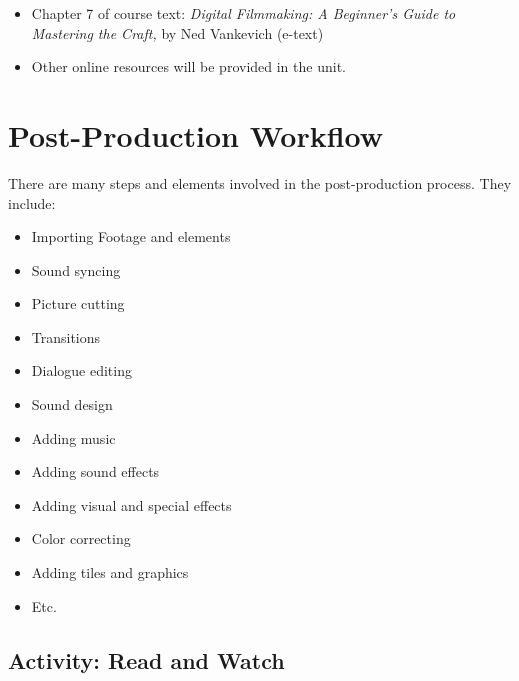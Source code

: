 \documentclass[
]{book}
\providecommand{\tightlist}{%
  \setlength{\itemsep}{0pt}\setlength{\parskip}{0pt}}
\begin{document}
\begin{itemize}
\tightlist
\item
  Chapter 7 of course text: \emph{Digital Filmmaking: A Beginner's Guide to Mastering the Craft,} by Ned Vankevich (e-text)
\item
  Other online resources will be provided in the unit.
\end{itemize}

\hypertarget{post-production-workflow}{%
\section{Post-Production Workflow}\label{post-production-workflow}}

There are many steps and elements involved in the post-production process. They include:

\begin{itemize}
\tightlist
\item
  Importing Footage and elements\\
\item
  Sound syncing\\
\item
  Picture cutting\\
\item
  Transitions\\
\item
  Dialogue editing\\
\item
  Sound design\\
\item
  Adding music\\
\item
  Adding sound effects\\
\item
  Adding visual and special effects\\
\item
  Color correcting\\
\item
  Adding tiles and graphics\\
\item
  Etc.
\end{itemize}

\hypertarget{activity-read-and-watch}{%
\subsection*{Activity: Read and Watch}\label{activity-read-and-watch}}
\end{document}
